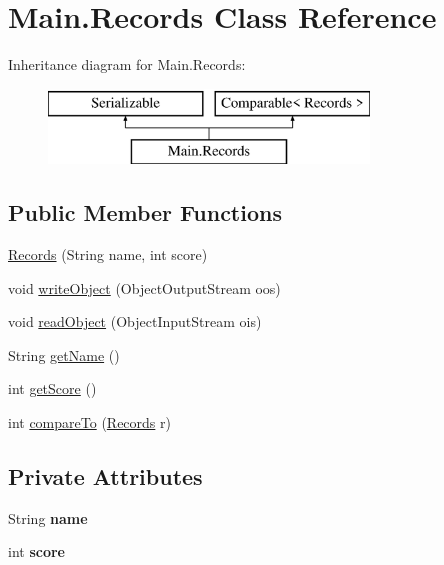 \hypertarget{class_main_1_1_records}{}\section{Main.\+Records Class Reference}
\label{class_main_1_1_records}
Inheritance diagram for Main.\+Records\+:\begin{figure}[H]
\begin{center}
\leavevmode
\includegraphics[height=2.000000cm]{class_main_1_1_records}
\end{center}
\end{figure}
\subsection*{Public Member Functions}
\begin{DoxyCompactItemize}
\item 
\hyperlink{class_main_1_1_records_a82bb250f41e6d1cbad9c9d520772d238}{Records} (String name, int score)
\item 
void \hyperlink{class_main_1_1_records_ac1c5fc940f98770509ba2bf237e5ea0b}{write\+Object} (Object\+Output\+Stream oos)
\item 
void \hyperlink{class_main_1_1_records_a78fec3236933217b223e93e5c6eb34d7}{read\+Object} (Object\+Input\+Stream ois)
\item 
String \hyperlink{class_main_1_1_records_ac6f93eb98cdd21d52294c4d90dc76d99}{get\+Name} ()
\item 
int \hyperlink{class_main_1_1_records_a97027b0438ca6123ccda8330987d0174}{get\+Score} ()
\item 
int \hyperlink{class_main_1_1_records_ab5fde5dd0ad92223abbed30c7b22f607}{compare\+To} (\hyperlink{class_main_1_1_records}{Records} r)
\end{DoxyCompactItemize}
\subsection*{Private Attributes}
\begin{DoxyCompactItemize}
\item 
String {\bfseries name}\hypertarget{class_main_1_1_records_a3658db92b27c25c237f903c01afa6443}{}\label{class_main_1_1_records_a3658db92b27c25c237f903c01afa6443}

\item 
int {\bfseries score}\hypertarget{class_main_1_1_records_ad514b8ec841175bb98b168c63753f493}{}\label{class_main_1_1_records_ad514b8ec841175bb98b168c63753f493}

\end{DoxyCompactItemize}



